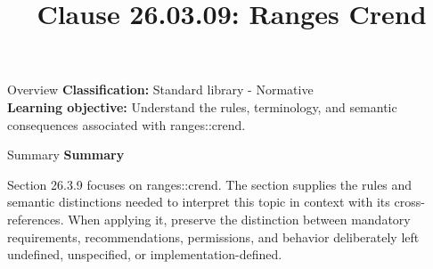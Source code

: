 \documentclass[10pt,letterpaper]{article}
\title{Clause 26.03.09: Ranges Crend}
\author{}
\date{}
\begin{document}
\maketitle
\begin{CornellOverviewBox}{Overview}
\textbf{Classification:} Standard library - Normative\\[2pt]
\textbf{Learning objective:} Understand the rules, terminology, and semantic consequences associated with ranges::crend.
\end{CornellOverviewBox}\begin{CornellSummaryBox}{Summary}
{\sffamily\bfseries\color{Accent} Summary}\par\vspace{3pt}Section 26.3.9 focuses on ranges::crend. The section supplies the rules and semantic distinctions needed to interpret this topic in context with its cross-references. When applying it, preserve the distinction between mandatory requirements, recommendations, permissions, and behavior deliberately left undefined, unspecified, or implementation-defined.
\end{CornellSummaryBox}
\end{document}
